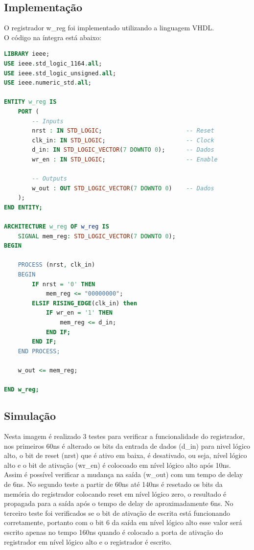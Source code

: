 \documentclass{article}
\begin{document}
\subsection{Implementação}

O registrador w\_reg foi implementado utilizando a linguagem VHDL.\\

O código na íntegra está abaixo:\\

\begin{lstlisting}[language=VHDL, caption={Código VHDL w\_reg}]
LIBRARY ieee;
USE ieee.std_logic_1164.all;
USE ieee.std_logic_unsigned.all;
USE ieee.numeric_std.all;

ENTITY w_reg IS
    PORT (
        -- Inputs
        nrst : IN STD_LOGIC;                        -- Reset
        clk_in: IN STD_LOGIC;                       -- Clock
        d_in: IN STD_LOGIC_VECTOR(7 DOWNTO 0);      -- Dados
        wr_en : IN STD_LOGIC;                       -- Enable

        -- Outputs
        w_out : OUT STD_LOGIC_VECTOR(7 DOWNTO 0)    -- Dados
    );
END ENTITY;

ARCHITECTURE w_reg OF w_reg IS
    SIGNAL mem_reg: STD_LOGIC_VECTOR(7 DOWNTO 0);
BEGIN

    PROCESS (nrst, clk_in)
    BEGIN
        IF nrst = '0' THEN
            mem_reg <= "00000000";
        ELSIF RISING_EDGE(clk_in) then
            IF wr_en = '1' THEN
                mem_reg <= d_in;
            END IF;
        END IF;
    END PROCESS;

    w_out <= mem_reg;

END w_reg;
\end{lstlisting}

\subsection{Simulação}

Nesta imagem é realizado 3 testes para verificar a funcionalidade do registrador, nos primeiros 60ns é alterado os bits da entrada de dados (d\_in) para nivel lógico alto, o bit de reset (nrst) que é ativo em baixa, é desativado, ou seja, nível lógico alto e o bit de ativação (wr\_en) é colocoado em nível lógico alto após 10ns. Assim é possível verificar a mudança na saída (w\_out) com um tempo de delay de 6ns. No segundo teste a partir de 60ns até 140ns é resetado os bits da memória do registrador colocando reset em nível lógico zero, o resultado é propagada para a saída após o tempo de delay de aproximadamente 6ns. No terceiro teste foi verificados se o bit de ativação de escrita está funcionando corretamente, portanto com o bit 6 da saída em nível lógico alto esse valor será escrito apenas no tempo 160ns quando é colocado a porta de ativação do registrador em nível lógico alto e o registrador é escrito.
\end{document}
